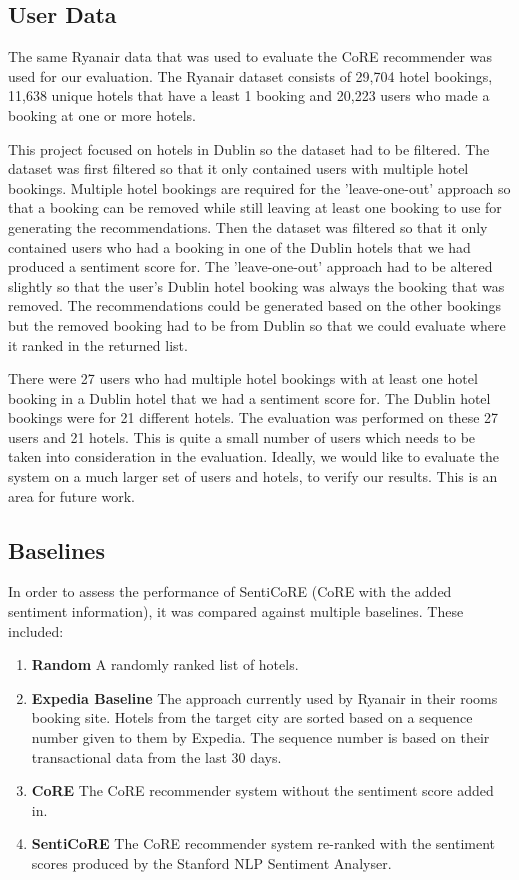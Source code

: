 \subsection{User Data}
The same Ryanair data that was used to evaluate the CoRE recommender was used for our evaluation. The Ryanair dataset consists of 29,704 hotel bookings, 11,638 unique hotels that have a least 1 booking and 20,223 users who made a booking at one or more hotels.

This project focused on hotels in Dublin so the dataset had to be filtered. The dataset was first filtered so that it only contained users with multiple hotel bookings. Multiple hotel bookings are required for the 'leave-one-out' approach so that a booking can be removed while still leaving at least one booking to use for generating the recommendations. Then the dataset was filtered so that it only contained users who had a booking in one of the Dublin hotels that we had produced a sentiment score for. The 'leave-one-out' approach had to be altered slightly so that the user's Dublin hotel booking was always the booking that was removed. The recommendations could be generated based on the other bookings but the removed booking had to be from Dublin so that we could evaluate where it ranked in the returned list.

There were 27 users who had multiple hotel bookings with at least one hotel booking in a Dublin hotel that we had a sentiment score for. The Dublin hotel bookings were for 21 different hotels. The evaluation was performed on these 27 users and 21 hotels. This is quite a small number of users which needs to be taken into consideration in the evaluation. Ideally, we would like to evaluate the system on a much larger set of users and hotels, to verify our results. This is an area for future work.

\subsection{Baselines}

In order to assess the performance of SentiCoRE (CoRE with the added sentiment information), it was compared against multiple baselines. These included: 
\begin{enumerate}
    \item \textbf{Random} \newline
    A randomly ranked list of hotels.
    \item \textbf{Expedia Baseline} \newline
    The approach currently used by Ryanair in their rooms booking site. Hotels from the target city are sorted based on a sequence number given to them by Expedia. The sequence number is based on their transactional data from the last 30 days.
    \item \textbf{CoRE} \newline
    The CoRE recommender system without the sentiment score added in.
    \item \textbf{SentiCoRE} \newline
    The CoRE recommender system re-ranked with the sentiment scores produced by the Stanford NLP Sentiment Analyser.
\end{enumerate}

